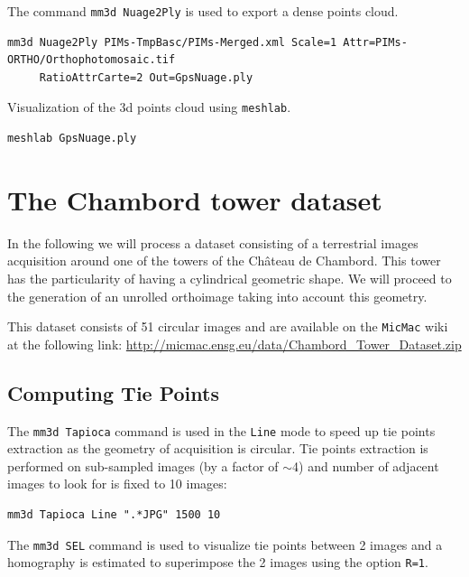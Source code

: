 The command {\tt mm3d Nuage2Ply} is used to export a dense points cloud.
\begin{verbatim}
mm3d Nuage2Ply PIMs-TmpBasc/PIMs-Merged.xml Scale=1 Attr=PIMs-ORTHO/Orthophotomosaic.tif 
     RatioAttrCarte=2 Out=GpsNuage.ply
\end{verbatim}

Visualization of the 3d points cloud using {\tt meshlab}.
\begin{verbatim}
meshlab GpsNuage.ply
\end{verbatim}


\section{The Chambord tower dataset}


In the following we will process a dataset consisting of a terrestrial images acquisition around one of the towers of the Ch\^{a}teau de Chambord. This tower has the particularity of having a cylindrical geometric shape. We will proceed to the generation of an unrolled orthoimage taking into account this geometry.\newline

This dataset consists of 51 circular images and are available on the {\tt MicMac} wiki at the following link: \url{http://micmac.ensg.eu/data/Chambord_Tower_Dataset.zip}

\subsection{Computing Tie Points}
The {\tt mm3d Tapioca} command is used in the {\tt Line} mode to speed up tie points extraction as the geometry of acquisition is circular. Tie points extraction is performed on sub-sampled images (by a factor of $\sim$4) and number of adjacent images to look for is fixed to 10 images:

\begin{verbatim}
mm3d Tapioca Line ".*JPG" 1500 10
\end{verbatim}

The {\tt mm3d SEL} command is used to visualize tie points between 2 images and a homography is estimated to superimpose the 2 images using the option {\tt R=1}. 

